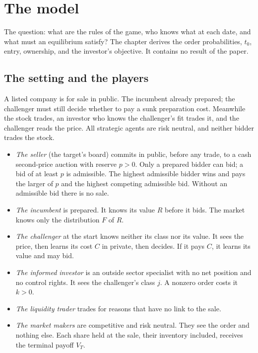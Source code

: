 \chapter{The model}\label{ch:model}

\begin{chapterplan}
The question: what are the rules of the game, who knows what at each date, and what must an equilibrium satisfy?
The chapter derives the order probabilities, \(t_0\), entry, ownership, and the investor's objective. It contains no result of the paper.
\end{chapterplan}

\section{The setting and the players}\label{sec:model-players}

A listed company is for sale in public. The incumbent already prepared; the challenger must still decide whether to pay a sunk preparation cost.
Meanwhile the stock trades, an investor who knows the challenger's fit trades it, and the challenger reads the price.
All strategic agents are risk neutral, and neither bidder trades the stock.
\begin{itemize}[nosep]
\item \emph{The seller} (the target's board) commits in public, before any trade, to a cash second-price auction with reserve \(p>0\). Only a prepared bidder can bid; a bid of at least \(p\) is admissible. The highest admissible bidder wins and pays the larger of \(p\) and the highest competing admissible bid. Without an admissible bid there is no sale.
\item \emph{The incumbent} is prepared. It knows its value \(R\) before it bids. The market knows only the distribution \(F\) of \(R\).
\item \emph{The challenger} at the start knows neither its class nor its value. It sees the price, then learns its cost \(C\) in private, then decides. If it pays \(C\), it learns its value and may bid.
\item \emph{The informed investor} is an outside sector specialist with no net position and no control rights. It sees the challenger's class \(j\). A nonzero order costs it \(k>0\).
\item \emph{The liquidity trader} trades for reasons that have no link to the sale.
\item \emph{The market makers} are competitive and risk neutral. They see the order and nothing else. Each share held at the sale, their inventory included, receives the terminal payoff \(V_T\).
\end{itemize}

